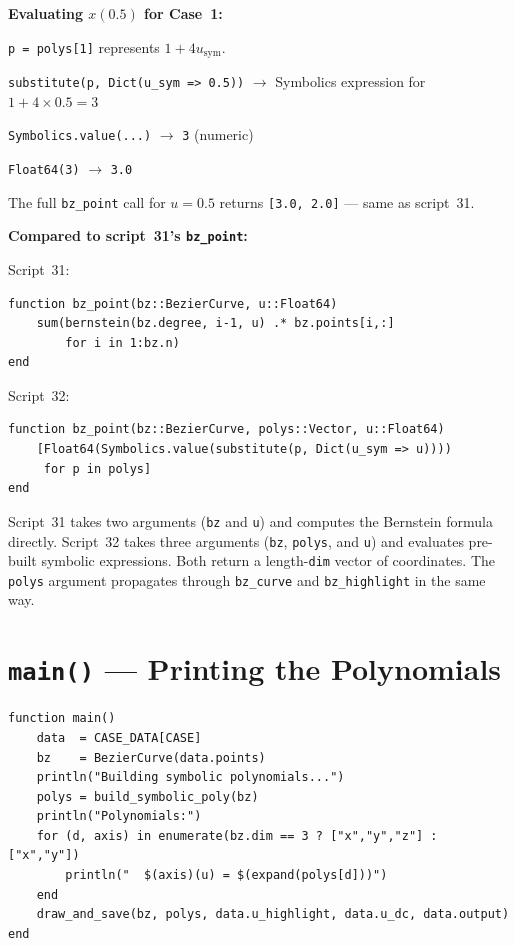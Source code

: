 \documentclass[12pt, a4paper]{article}
\newcommand{\cd}[1]{\texttt{#1}}
\begin{document}
\begin{examplebox}
\textbf{Evaluating $x(0.5)$ for Case~1:}

\cd{p = polys[1]} represents $1 + 4u_\text{sym}$.

\cd{substitute(p, Dict(u\_sym => 0.5))}
$\to$ Symbolics expression for $1 + 4 \times 0.5 = 3$

\cd{Symbolics.value(...)} $\to$ \cd{3} (numeric)

\cd{Float64(3)} $\to$ \cd{3.0}

The full \cd{bz\_point} call for $u=0.5$ returns
\cd{[3.0, 2.0]} --- same as script~31. \checkmark
\end{examplebox}

\begin{notebox}
\textbf{Compared to script~31's \cd{bz\_point}:}

Script~31:
\begin{verbatim}
function bz_point(bz::BezierCurve, u::Float64)
    sum(bernstein(bz.degree, i-1, u) .* bz.points[i,:]
        for i in 1:bz.n)
end
\end{verbatim}

Script~32:
\begin{verbatim}
function bz_point(bz::BezierCurve, polys::Vector, u::Float64)
    [Float64(Symbolics.value(substitute(p, Dict(u_sym => u))))
     for p in polys]
end
\end{verbatim}

Script~31 takes two arguments (\cd{bz} and \cd{u}) and
computes the Bernstein formula directly.
Script~32 takes three arguments (\cd{bz}, \cd{polys},
and \cd{u}) and evaluates pre-built symbolic expressions.
Both return a length-\cd{dim} vector of coordinates.
The \cd{polys} argument propagates through
\cd{bz\_curve} and \cd{bz\_highlight} in the same way.
\end{notebox}


\section{\texttt{main()} --- Printing the Polynomials}

\begin{verbatim}
function main()
    data  = CASE_DATA[CASE]
    bz    = BezierCurve(data.points)
    println("Building symbolic polynomials...")
    polys = build_symbolic_poly(bz)
    println("Polynomials:")
    for (d, axis) in enumerate(bz.dim == 3 ? ["x","y","z"] : ["x","y"])
        println("  $(axis)(u) = $(expand(polys[d]))")
    end
    draw_and_save(bz, polys, data.u_highlight, data.u_dc, data.output)
end
\end{verbatim}
\end{document}
